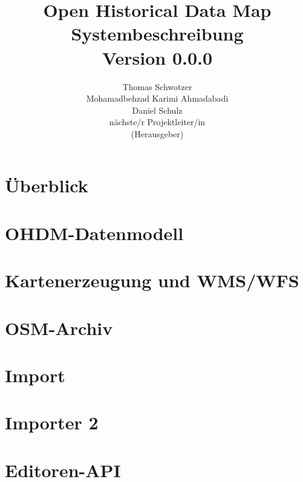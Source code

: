 \documentclass[german]{book}
\begin{document}
\title{Open Historical Data Map\\
Systembeschreibung \\
Version 0.0.0
}

\author{
Thomas Schwotzer \\
Mohamadbehzad Karimi Ahmadabadi\\
Daniel Schulz\\
nächste/r Projektleiter/in\\
(Herausgeber)
}

\maketitle

\tableofcontents

\chapter{Überblick}


\chapter{OHDM-Datenmodell}


\chapter{Kartenerzeugung und WMS/WFS}


\chapter{OSM-Archiv}


\chapter{Import}


\chapter{Importer 2}


\chapter{Editoren-API}

\end{document}
